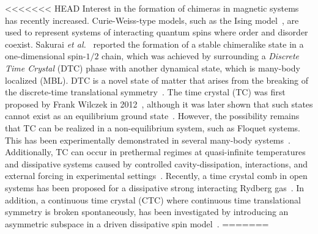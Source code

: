 \documentclass[12pt]{iopart}
\begin{document}
<<<<<<< HEAD
Interest in the formation of chimeras in magnetic systems has recently increased. Curie-Weiss-type models, such as the Ising model~\cite{singh_chimera_2011}, are used to represent systems of interacting quantum spins where order and disorder coexist. Sakurai \textit{et al.}~\cite{sakurai_phys_nodate} reported the formation of a stable chimeralike state in a one-dimensional spin-$1/2$ chain, which was achieved by surrounding a \textit{Discrete Time Crystal} (DTC) phase with another dynamical state, which is many-body localized (MBL). DTC is a novel state of matter that arises from the breaking of the discrete-time translational symmetry~\cite{else_floquet_2016}. The time crystal (TC) was first proposed by Frank Wilczek in 2012~\cite{wilczek_quantum_2012}, although it was later shown that such states cannot exist as an equilibrium ground state~\cite{Bruno_comment_1, Bruno2013, watanabe_absence_2015}. However, the possibility remains that TC can be realized in a non-equilibrium system, such as Floquet systems. This has been experimentally demonstrated in several many-body systems~\cite{huang2018,taheri_all-optical_2022, Soham2018, zhang_observation_2017, yao_time_2018,frey_realization_2022, rovny_observation_2018, sacha_time_nodate,golletz_basis_2022}.  Additionally, TC can occur in prethermal regimes at quasi-infinite temperatures ~\cite{Stasiuk2023} and dissipative systems caused by controlled cavity-dissipation, interactions, and external forcing in experimental settings~\cite{Hans2021}. Recently, a time crystal comb in open systems has been proposed for a dissipative strong interacting Rydberg gas~\cite{jiao2024}. In addition, a continuous time crystal (CTC) where continuous time translational symmetry is broken spontaneously,  has been investigated by introducing an asymmetric subspace in a driven dissipative spin model~\cite{solanki2024}.
=======
\end{document}
